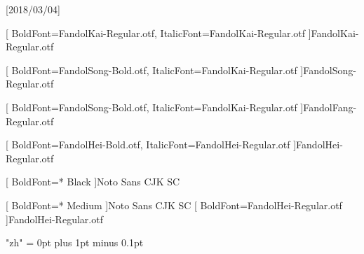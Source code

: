 
[2018/03/04]

\setsansfont{TeX Gyre Heros}	%





[
	BoldFont=FandolKai-Regular.otf, ItalicFont=FandolKai-Regular.otf
]{FandolKai-Regular.otf}

[
	BoldFont=FandolSong-Bold.otf,
	ItalicFont=FandolKai-Regular.otf
]{FandolSong-Regular.otf}

[
	BoldFont=FandolSong-Bold.otf,
	ItalicFont=FandolKai-Regular.otf
]{FandolFang-Regular.otf}

[
	BoldFont=FandolHei-Bold.otf,
	ItalicFont=FandolHei-Regular.otf
]{FandolHei-Regular.otf}


[
	BoldFont=* Black
]{Noto Sans CJK SC}

[
	BoldFont=* Medium
]{Noto Sans CJK SC}	%
[
	BoldFont=FandolHei-Regular.otf
]{FandolHei-Regular.otf}	%

\XeTeXlinebreaklocale "zh"
\XeTeXlinebreakskip = 0pt plus 1pt minus 0.1pt

\newcommand\kaishu{\CJKfamily{kai}} %
\newcommand\songti{\CJKfamily{song}} %
\newcommand\heiti{\CJKfamily{hei}}	%
\newcommand\thmheiti{\CJKfamily{hei2}}	%
\newcommand\fangsong{\CJKfamily{fangsong}} %
\renewcommand{\em}{\bfseries\CJKfamily{emfont}} %